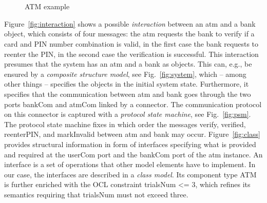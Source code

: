 \documentclass[10pt, a4paper]{isov2}
\renewcommand{\figurerefname}{Figure}
\renewcommand{\fref}[1]{\figurerefname~\ref{#1}}
\newcommand{\uml}[1]{\textsf{#1}}
\begin{document}
\begin{figure}[!ht]
\centering
{}
\hspace*{0.5cm}
\\
\hspace*{0.4cm}
\\
\vspace*{-1.5ex}
\caption{ATM example}\label{fig:atm-example}
\end{figure}

\fref{fig:interaction} shows a possible \emph{interaction} between
an \uml{atm} and a \uml{bank} object, which consists of four messages:
the \uml{atm} requests the \uml{bank} to \uml{verify} if a card and PIN
number combination is valid, in the first case the \uml{bank} requests
to reenter the PIN, in the second case the verification is successful.
This interaction presumes that the system has an \uml{atm} and a
\uml{bank} as objects. This can, e.g., be ensured by a \emph{composite
  structure model}, see Fig.~\ref{fig:system}, which -- among other
things -- specifies the objects in the initial system state.
Furthermore, it specifies that the communication between \uml{atm} and
\uml{bank} goes through the two ports \uml{bankCom} and \uml{atmCom}
linked by a connector.  The communication protocol on this connector is
captured with a \emph{protocol state machine}, see Fig.~\ref{fig:psm}.
The protocol state machine fixes in which order the messages
\uml{verify}, \uml{verified}, \uml{reenterPIN}, and \uml{markInvalid}
between \uml{atm} and \uml{bank} may occur.  Figure~\ref{fig:class}
provides structural information in form of interfaces specifying what is
provided and required at the \uml{userCom} port and the \uml{bankCom}
port of the \uml{atm} instance.  An interface is a set of operations
that other model elements have to implement. In our case, the
interfaces are described in a \emph{class model}. Its component type 
\uml{ATM} is further enriched with the OCL
constraint \uml{trialsNum <= 3}, which refines its semantics requiring
that \uml{trialsNum} must not exceed three.
\end{document}
